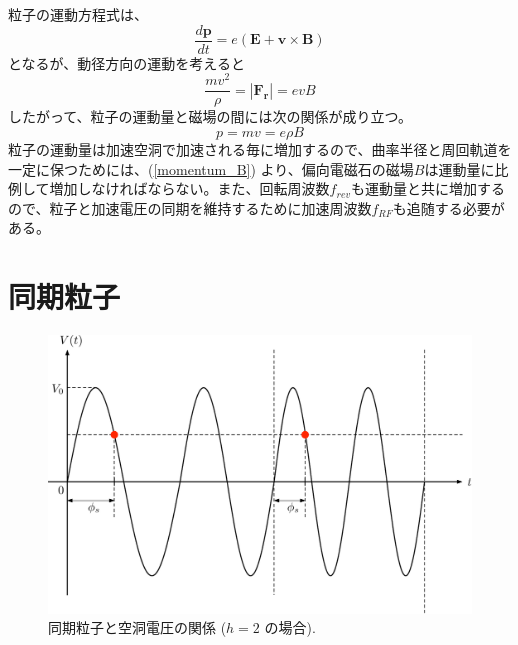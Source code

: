 \documentclass[10pt,a4paper]{jlreq}
\begin{document}
粒子の運動方程式は、
%
\begin{equation}
  \frac{d\bm{p}}{dt} = e (\bm{E} + \bm{v}\times \bm{B})
\end{equation}
%
となるが、動径方向の運動を考えると
%
\begin{equation}
  \frac{m v^2}{\rho} = |\bm{F_r}| = e v B
\end{equation}
%
したがって、粒子の運動量と磁場の間には次の関係が成り立つ。
%
\begin{equation}
  p = mv = e \rho B
  \label{momentum_B}
\end{equation}
%
粒子の運動量は加速空洞で加速される毎に増加するので、曲率半径と周回軌道を一定に保つためには、(\ref{momentum_B}) より、偏向電磁石の磁場$B$は運動量に比例して増加しなければならない。また、回転周波数$f_{rev}$も運動量と共に増加するので、粒子と加速電圧の同期を維持するために加速周波数$f_{RF}$も追随する必要がある。

\section{同期粒子}

\begin{figure}[hbt]
  \begin{center}
    \includegraphics[width=15cm,clip]{figs/synchronous.pdf}
    \caption{同期粒子と空洞電圧の関係 ($h=2$ の場合).}
    \label{synchronous}
  \end{center}
\end{figure}
\end{document}
